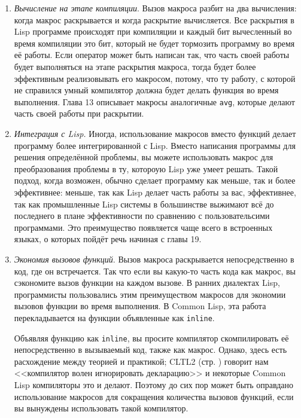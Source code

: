 \documentclass[12pt, a4paper]{article} %
\begin{document}
\begin{enumerate}
    \item \textit{Вычисление на этапе компиляции}. Вызов макроса разбит на два вычисления: когда макрос раскрывается и когда раскрытие вычисляется. Все раскрытия в Lisp программе происходят при компиляции и каждый бит вычесленный во время компиляции это бит, который не будет тормозить программу во время её работы. Если оператор может быть написан так, что часть своей работы будет выполняться на этапе раскрытия макроса, тогда будет более эффективным реализовывать его макросом, потому, что ту работу, с которой не справился умный компилятор должна будет делать функция во время выполнения. Глава 13 описывает макросы аналогичные \texttt{avg}, которые делают часть своей работы при раскрытии.

    \item \textit{Интеграция с Lisp.} Иногда, использование макросов вместо функций делает программу более интегрированной с Lisp. Вместо написания программы для решения определённой проблемы, вы можете использовать макрос для преобразования проблемы в ту, котороую Lisp уже умеет решать. Такой подход, когда возможен, обычно сделает программу как меньше, так и более эффективнее: меньше, так как Lisp делает часть работы за вас, эффективнее, так как промышленные Lisp системы в большинстве выжимают всё до последнего в плане эффективности по сравнению с пользовательсими программами. Это преимущество появляется чаще всего в встроенных языках, о которых пойдёт речь начиная с главы 19.
    
    \item \textit{Экономия вызовов функций}. Вызов макроса раскрывается непосредственно в код, где он встречается. Так что если вы какую-то часть кода как макрос, вы сэкономите вызов функции на каждом вызове. В ранних диалектах Lisp, программисты пользовались этим преимуществом макросов для экономии вызовов функции во время выполнения. В Common Lisp, эта работа перекладывается на функции объявленные как \texttt{inline}.

    Объявляя функцию как \texttt{inline}, вы просите компилятор скомпилировать её непосредственно в вызываемый код, также как макрос. Однако, здесь есть расхождение между теорией и практикой; \textsc{CLTL2} (стр. \pageref{229}) говорит нам <<компилятор волен игнорировать декларацию>> и некоторые Common Lisp компиляторы это и делают. Поэтому до сих пор может быть оправдано использование макросов для сокращения количества вызовов функций, если вы вынуждены использовать такой компилятор.
\end{enumerate}
\end{document}
